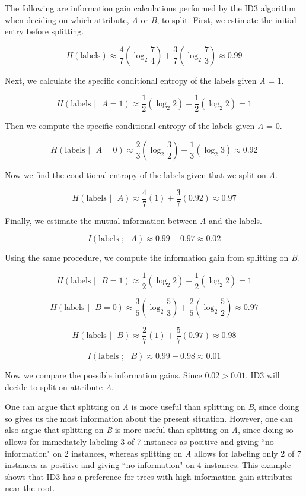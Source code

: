 \documentclass[solution, letterpaper]{cs121}
\begin{document}

\subproblem The following are information gain calculations performed by the ID3 algorithm when deciding on which attribute, \emph{A} or \emph{B}, to split. First, we estimate the initial entry before splitting.

\[ H(\text{labels}) \approx \frac{4}{7} (\log_2 \frac{7}{4}) + \frac{3}{7} (\log_2 \frac{7}{3}) \approx 0.99 \]

Next, we calculate the specific conditional entropy of the labels given \emph{A} = 1.

\[ H(\text{labels } | \text{ } A = 1) \approx \frac{1}{2} (\log_2 2) + \frac{1}{2} (\log_2 2) = 1 \]

Then we compute the specific conditional entropy of the labels given \emph{A} = 0.

\[ H(\text{labels } | \text{ } A = 0) \approx \frac{2}{3} (\log_2 \frac{3}{2}) + \frac{1}{3} (\log_2 3) \approx 0.92 \]

Now we find the conditional entropy of the labels given that we split on \emph{A}.

\[ H(\text{labels } | \text{ } A) \approx \frac{4}{7}(1) + \frac{3}{7}(0.92) \approx 0.97 \]

Finally, we estimate the mutual information between \emph{A} and the labels.

\[ I(\text{labels } ; \text{ } A) \approx  0.99 - 0.97 \approx 0.02\]

Using the same procedure, we compute the information gain from splitting on \emph{B}.

\[ H(\text{labels } | \text{ } B = 1) \approx  \frac{1}{2} (\log_2 2) + \frac{1}{2} (\log_2 2) = 1 \]

\[ H(\text{labels } | \text{ } B = 0) \approx  \frac{3}{5} (\log_2 \frac{5}{3}) + \frac{2}{5} (\log_2 \frac{5}{2}) \approx 0.97 \]

\[ H(\text{labels } | \text{ } B) \approx \frac{2}{7}(1) + \frac{5}{7}(0.97) \approx 0.98 \]

\[ I(\text{labels } ; \text{ } B) \approx  0.99 - 0.98 \approx 0.01 \]

Now we compare the possible information gains. Since $0.02 > 0.01$, ID3 will decide to split on attribute \emph{A}.

One can argue that splitting on \emph{A} is more useful than splitting on \emph{B}, since doing so gives us the most information about the present situation. However, one can also argue that splitting on \emph{B} is more useful than splitting on \emph{A}, since doing so allows for immediately labeling 3 of 7 instances as positive and giving  ``no information" on 2 instances, whereas splitting on \emph{A} allows for labeling only 2 of 7 instances as positive and giving ``no information" on 4 instances. This example shows that ID3 has a preference for trees with high information gain attributes near the root.
\end{document}
